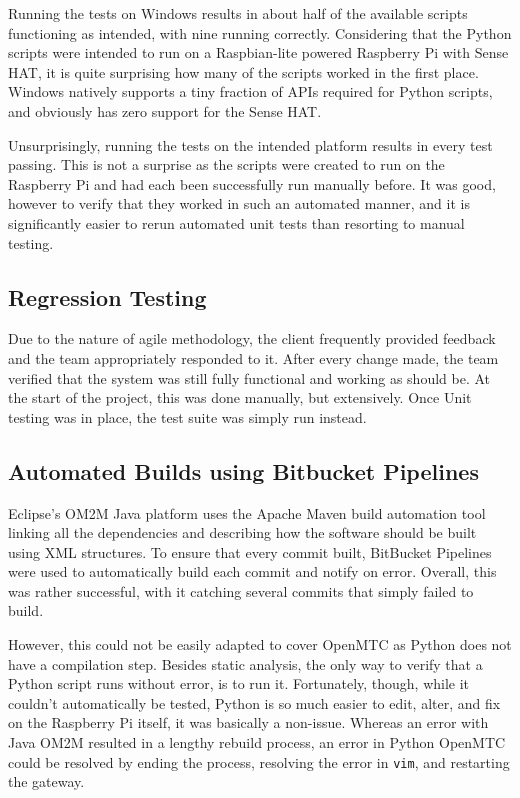 Running the tests on Windows results in about half of the available scripts functioning as intended, with nine running correctly. Considering that the Python scripts were intended to run on a Raspbian-lite powered Raspberry Pi with Sense HAT, it is quite surprising how many of the scripts worked in the first place. Windows natively supports a tiny fraction of APIs required for Python scripts, and obviously has zero support for the Sense HAT.

Unsurprisingly, running the tests on the intended platform results in every test passing. This is not a surprise as the scripts were created to run on the Raspberry Pi and had each been successfully run manually before. It was good, however to verify that they worked in such an automated manner, and it is significantly easier to rerun automated unit tests than resorting to manual testing.

\subsection{Regression Testing}

Due to the nature of agile methodology, the client frequently provided feedback and the team appropriately responded to it. After every change made, the team verified that the system was still fully functional and working as should be. At the start of the project, this was done manually, but extensively. Once Unit testing  was in place, the test suite was simply run instead.

\subsection{Automated Builds using Bitbucket Pipelines}

Eclipse's OM2M Java platform uses the Apache Maven build automation tool linking all the dependencies and describing how the software should be built using XML structures. To ensure that every commit built, BitBucket Pipelines were used to automatically build each commit and notify on error. Overall, this was rather successful, with it catching several commits that simply failed to build.

However, this could not be easily adapted to cover OpenMTC as Python does not have a compilation step. Besides static analysis, the only way to verify that a Python script runs without error, is to run it. Fortunately, though, while it couldn't automatically be tested, Python is so much easier to edit, alter, and fix on the Raspberry Pi itself, it was basically a non-issue. Whereas an error with Java OM2M resulted in a lengthy rebuild process, an error in Python OpenMTC could be resolved by ending the process, resolving the error in \lstinline{vim}, and restarting the gateway.

